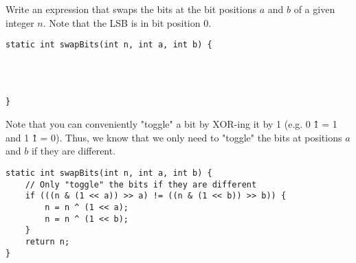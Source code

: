 
\question Write an expression that swaps the bits at the bit positions $a$ and $b$ of a given integer $n$. Note that the LSB is in bit position 0.

\ifprintanswers\else
\begin{lstlisting}
static int swapBits(int n, int a, int b) {
    
    
    
    
}
\end{lstlisting}
\fi

\begin{solution}
Note that you can conveniently "toggle" a bit by XOR-ing it by 1 (e.g. 0 \^ 1 = 1 and 1 \^ 1 = 0). Thus, we know that we only need to "toggle" the bits at positions $a$ and $b$ if they are different.
\begin{lstlisting}
static int swapBits(int n, int a, int b) {
    // Only "toggle" the bits if they are different
    if (((n & (1 << a)) >> a) != ((n & (1 << b)) >> b)) {
        n = n ^ (1 << a);
        n = n ^ (1 << b);
    }
    return n;
}
\end{lstlisting}
\end{solution}